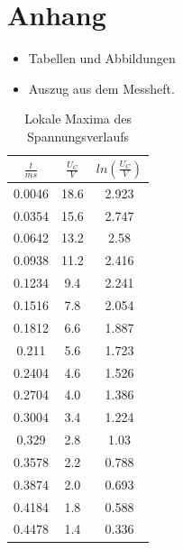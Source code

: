 \documentclass[11pt,ngerman,a4paper]{article}
\begin{document}
\section{Anhang}
\begin{itemize}
\item Tabellen und Abbildungen
\item Auszug aus dem Messheft.


\end{itemize}

\newpage
\begin{table}[H]
\centering
\begin{tabular}{|c|c|c|}
\hline
$\frac{t}{ms}$ & $\frac{U_C}{V}$ & $ln(\frac{U_C}{V})$ \\
\hline
0.0046 & 18.6 & 2.923\\
0.0354 & 15.6 & 2.747\\
0.0642 & 13.2 & 2.58\\
0.0938 & 11.2 & 2.416\\
0.1234 & 9.4 & 2.241\\
0.1516 & 7.8 & 2.054\\
0.1812 & 6.6 & 1.887\\
0.211 & 5.6 & 1.723\\
0.2404 & 4.6 & 1.526\\
0.2704 & 4.0 & 1.386\\
0.3004 & 3.4 & 1.224\\
0.329 & 2.8 & 1.03\\
0.3578 & 2.2 & 0.788\\
0.3874 & 2.0 & 0.693\\
0.4184 & 1.8 & 0.588\\
0.4478 & 1.4 & 0.336\\
\hline
\end{tabular}
\label{mtab1}
\caption{Lokale Maxima des Spannungsverlaufs}
\end{table}
\end{document}
